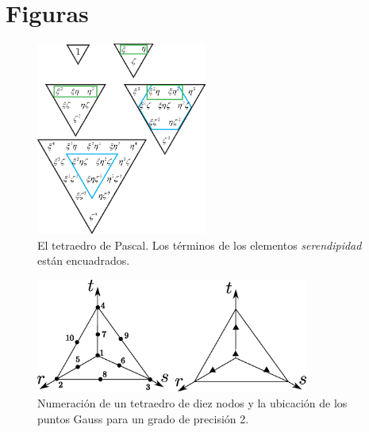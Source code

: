 \documentclass[11pt, a4paper,titlepage]{article}
\newcommand{\feaQP}{null.tex}
\newcommand{\annexFile}{null.tex}
\begin{document}
\section*{Figuras}
\begin{figure}[htb!]
	\centering
	\includegraphics[width=0.5\textwidth]{fig/pascalsTetra.eps}
	\caption{El tetraedro de Pascal. Los términos de los elementos \textit{serendipidad} están encuadrados.}
	\label{fig:PascalsTetrahedron}
\end{figure}

\begin{figure}[htb!]
	\centering
	\includegraphics[width=0.8\textwidth]{fig/T10numbering.eps}
	\caption{Numeración de un tetraedro de diez nodos y la ubicación de los puntos Gauss para un grado de precisión 2.}
	\label{fig:T10numbering}
\end{figure}





\end{document}
